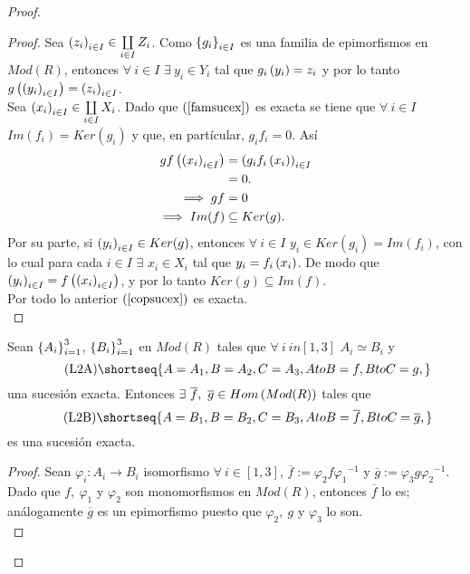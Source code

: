 \documentclass{article}
\begin{document}
\begin{enumerate}[label=\textbf{Ej \arabic*.}]
\begin{proof}
\begin{proof}
				 Sea ${\left({z}_{i}\right)}_{i\in I}\in\coprod\limits_{i\in I}Z_i$. Como ${\left\{{g}_{i}\right\}}_{i\in I}$ es una familia de epimorfismos en $Mod(R)$, entonces $\forall\ i\in I$ $\exists\ y_i\in Y_i$ tal que $g_i \left(y_i\right)=z_i$ y por lo tanto $g\left({\left({y}_{i}\right)}_{i\in I}\right)={\left({z}_{i}\right)}_{i\in I}$.\\
				 Sea ${\left({x}_{i}\right)}_{i\in I}\in \coprod\limits_{i\in I}X_i$. Dado que $\left(\ref{famsucex}\right)$ es exacta se tiene que $\forall\ i\in I$ $Im(f_i)=Ker(g_i)$ y que, en partícular, $g_i f_i=0$. Así
				\begin{align*}
					gf\left({\left({x}_{i}\right)}_{i\in I}\right)&=\left(g_if_i\left(x_i\right)\right)_{i\in I}\\
					&=0.\\
					\implies gf&=0\\
					\implies Im(f)&\subseteq Ker(g).
				\end{align*}
				Por su parte, si ${\left({y}_{i}\right)}_{i\in I}\in Ker(g)$, entonces $\forall\ i\in I$ $y_i\in Ker(g_i)=Im(f_i)$, con lo cual para cada $i\in I$ $\exists$ $x_i\in X_i$ tal que $y_i=f_i \left(x_i\right)$. De modo que ${\left({y}_{i}\right)}_{i\in I}=f\left({\left({x}_{i}\right)}_{i\in I}\right)$, y por lo tanto $Ker(g)\subseteq Im(f)$.\\
				Por todo lo anterior $\left(\ref{copsucex}\right)$ es exacta.\\
			\end{proof}
			\begin{lem}
				Sean ${\left\{{A}_{i}\right\}}_{i=1}^{3}$, ${\left\{{B}_{i}\right\}}_{i=1}^{3}$ en $Mod(R)$ tales que $\forall\ i\ in [1,3]$ $A_i\simeq B_i$ y
				\begin{equation*}\label{sucexbase}\tag{L2A}
					\shortseq{A=A_1,B=A_2,C=A_3,AtoB=f,BtoC=g,}
				\end{equation*} una sucesión exacta. Entonces 
				$\exists\ \overline{f},\ \overline{g}\in Hom\lrprth{Mod(R)}$ tales que
				\begin{equation*}\label{sucexiso}\tag{L2B}
					\shortseq{A=B_1,B=B_2,C=B_3,AtoB=\overline{f},BtoC=\overline{g},}
				\end{equation*}
				es una sucesión exacta.
			\end{lem}
			\begin{proof}
				Sean $\varphi_i:A_i\to B_i$ isomorfismo $\forall\ i\in[1,3]$, $\overline{f}:=\varphi_2f{\varphi_1}^{-1}$ y $\overline{g}:=\varphi_3
				g{\varphi_2}^{-1}$. Dado que $f,\ \varphi_1$ y $\varphi_2$ son monomorfismos en $Mod(R)$, entonces $\overline{f}$ lo es; análogamente $\overline{g}$ es un epimorfismo puesto que $\varphi_2,\ g$ y $\varphi_3$ lo son. \\

\end{proof}
\end{proof}
\end{enumerate}
\end{document}
